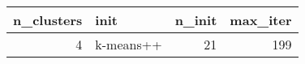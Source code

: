 \begin{tabular}{rlrr}
\toprule
n_clusters & init & n_init & max_iter \\
\midrule
4 & k-means++ & 21 & 199 \\
\bottomrule
\end{tabular}
